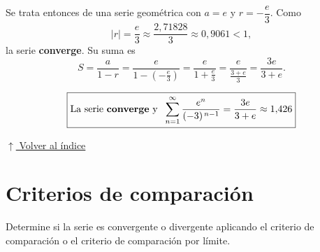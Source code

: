 \documentclass[12pt]{article}
\newcommand{\volverindice}{%
    \vspace{1em}%
    \begin{flushright}%
        \hyperlink{indice}{\small $\uparrow$ Volver al índice}%
    \end{flushright}%
}
\begin{document}
\begin{enumerate}[label=\alph*.-]
    Se trata entonces de una serie geométrica con $a=e$ y $r=-\dfrac{e}{3}$.
    Como
    \[
    |r|=\frac{e}{3}\approx\frac{2{,}71828}{3}\approx 0{,}9061<1,
    \]
    la serie \textbf{converge}. Su suma es
    \[
    S=\frac{a}{1-r}
    =\frac{e}{1-\left(-\frac{e}{3}\right)}
    =\frac{e}{1+\frac{e}{3}}
    =\frac{e}{\frac{3+e}{3}}
    =\frac{3e}{3+e}.
    \]

    \[
    \boxed{
    \text{La serie \textbf{converge} y }\;
    \sum_{n=1}^{\infty}\frac{e^{n}}{(-3)^{\,n-1}}=\frac{3e}{3+e}\approx 1{,}426
    }
    \]

\end{enumerate}

\volverindice
\newpage


\section{Criterios de comparación}

Determine si la serie es convergente o divergente aplicando el criterio de
comparación o el criterio de comparación por límite.
\end{document}
